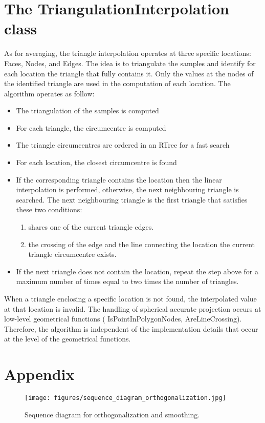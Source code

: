 \documentclass[biblatex]{deltares_manual}
\begin{document}
\chapter{The TriangulationInterpolation class}

As for averaging, the triangle interpolation operates at three specific locations: Faces, Nodes, and Edges. The idea is to triangulate the samples and identify for each location the triangle that fully contains it. Only the values at the nodes of the identified triangle are used in the computation of each location.
The algorithm operates as follow:
\begin{itemize}
	\item The triangulation of the samples is computed
	\item For each triangle, the circumcentre is computed
	\item The triangle circumcentres are ordered in an RTree for a fast search
	\item For each location, the closest circumcentre is found
	\item If the corresponding triangle contains the location then the linear interpolation is performed, otherwise, the next neighbouring triangle is searched. The next neighbouring triangle is the first triangle that satisfies these two conditions:
	\begin{enumerate}
		\item shares one of the current triangle edges.
		\item the crossing of the edge and the line connecting the location the current triangle circumcentre exists.
	\end{enumerate}
	\item If the next triangle does not contain the location, repeat the step above for a maximum number of times equal to two times the number of triangles.
\end{itemize}
When a triangle enclosing a specific location is not found, the interpolated value at that location is invalid. The handling of spherical accurate projection occurs at low-level geometrical functions ( IsPointInPolygonNodes, AreLineCrossing). Therefore, the algorithm is independent of the implementation details that occur at the level of the geometrical functions. 

\appendix
\chapter{Appendix}


\begin{figure}[H]
	\centering
	\texttt{[image: figures/sequence\_diagram\_orthogonalization.jpg]}
	\caption{Sequence diagram for orthogonalization and smoothing.}
\end{figure}


\LastPage
%
\end{document}
